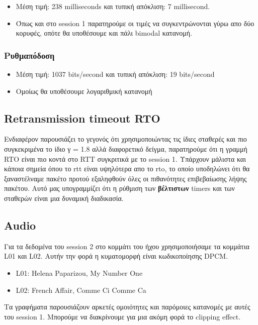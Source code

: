 \documentclass[hidelinks, 12pt, a4paper]{article}
\begin{document}
\begin{itemize}
    \item Μέση τιμή: 238 milliseconds και τυπική απόκλιση: 7 millisecond.
    \item Όπως και στο session 1 παρατηρούμε οι τιμές να συγκεντρώνονται γύρω απο δύο κορυφές, οπότε θα υποθέσουμε και πάλι bimodal κατανομή.
\end{itemize}

\subsubsection{Ρυθμαπόδοση}

\begin{itemize}
    \item Μέση τιμή: 1037 bits/second και τυπική απόκλιση: 19 bits/second
    \item Ομοίως θα υποθέσουμε λογαριθμική κατανομή
\end{itemize}

\subsection{Retransmission timeout RTO}

Ενδιαφέρον παρουσιάζει το γεγονός ότι χρησιμοποιώντας τις ίδιες σταθερές και πιο συγκεκριμένα το ίδιο γ = 1.8 αλλά διαφορετικό δείγμα, παρατηρούμε ότι η γραμμή RTO είναι πιο κοντά στο RTT συγκριτικά με το session 1. Υπάρχουν μάλιστα και κάποια σημεία όπου το rtt είναι υψηλότερα απο το rto, το οποίο υποδηλώνει ότι θα ξαναστέλναμε πακέτο προτού εξαληφθούν όλες οι πιθανότητες επιβεβαίωσης λήψης πακέτου. Αυτό μας υπογραμμίζει ότι η ρύθμιση των \textbf{βέλτιστων} timers και των σταθερών είναι μια δυναμική διαδικασία.

\subsection{Audio}

Για τα δεδομένα του session 2 στο κομμάτι του ήχου χρησιμοποιήσαμε τα κομμάτια L01 και L02. Αυτήν την φορά η κυματομορφή είναι κωδικοποίησης DPCM.

\begin{itemize}
    \item L01: Helena Paparizou, My Number One
    \item L02: French Affair, Comme Ci Comme Ca
\end{itemize}

Τα γραφήματα παρουσιάζουν αρκετές ομοιότητες και παρόμοιες κατανομές με αυτές του session 1. Μπορούμε να διακρίνουμε για μια ακόμη φορά το clipping effect.
\end{document}
